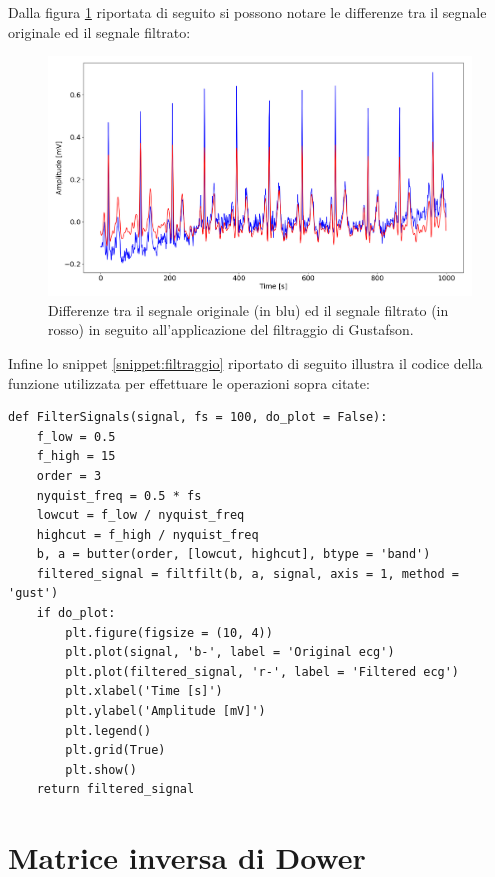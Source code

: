 \documentclass[12pt,italian]{report}
\begin{document}
	Dalla figura \ref{fig:filtraggio} riportata di seguito si possono notare le differenze tra il segnale originale ed il segnale filtrato:
	
	\begin{figure}[H]
		\centering
		\includegraphics[width=1\textwidth]{immagini/filtraggio.png}
		\captionsetup{justification=centering}
		\caption{Differenze tra il segnale originale (in blu) ed il segnale filtrato (in rosso) in seguito all'applicazione del filtraggio di Gustafson.}
		\label{fig:filtraggio}
	\end{figure}
	
	Infine lo snippet \ref{snippet:filtraggio} riportato di seguito illustra il codice della funzione utilizzata per effettuare le operazioni sopra citate:
	
	\lstset{language=Python}
	\begin{lstlisting}[aboveskip=15pt, belowskip=15pt, basicstyle=\fontsize{8}{10}\selectfont, keywordstyle=\color{blue}, breaklines=true, label=snippet:filtraggio]
def FilterSignals(signal, fs = 100, do_plot = False):
    f_low = 0.5
    f_high = 15
    order = 3
    nyquist_freq = 0.5 * fs
    lowcut = f_low / nyquist_freq
    highcut = f_high / nyquist_freq
    b, a = butter(order, [lowcut, highcut], btype = 'band')
    filtered_signal = filtfilt(b, a, signal, axis = 1, method = 'gust')
    if do_plot:
        plt.figure(figsize = (10, 4))
        plt.plot(signal, 'b-', label = 'Original ecg')
        plt.plot(filtered_signal, 'r-', label = 'Filtered ecg')
        plt.xlabel('Time [s]')
        plt.ylabel('Amplitude [mV]')
        plt.legend()
        plt.grid(True)
        plt.show()
    return filtered_signal
	\end{lstlisting}
	
	
	\section{Matrice inversa di Dower}
	\label{sec:matrice}
	
\end{document}
